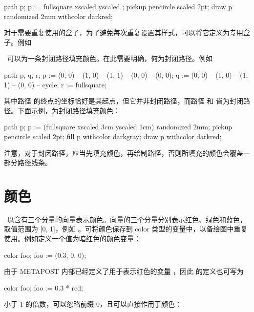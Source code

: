 \startexample
{}
path p;
p := fullsquare xscaled \overlaywidth yscaled \overlayheight;
pickup pencircle scaled 2pt;
draw p randomized 2mm withcolor darkred;
\stopuseMPgraphic

\stopexample
\typeexample[option=MP]  
\midaligned{\getexample}

对于需要重复使用的盒子，为了避免每次重复设置其样式，可以将它定义为专用盒子。例如

\starttyping[option=TEX]
\stoptyping

\METAPOST\ 可以为一条封闭路径填充颜色。在此需要明确，何为封闭路径。例如

\starttyping[option=MP]
path p, q, r;
p := (0, 0) -- (1, 0) -- (1, 1) -- (0, 0) -- (0, 0);
q := (0, 0) -- (1, 0) -- (1, 1) -- (0, 0) -- cycle;
r := fullsquare;
\stoptyping

\noindent 其中路径  的终点的坐标恰好是其起点，但它并非封闭路径，而路径  和  皆为封闭路径。下面示例，为封闭路径填充颜色：

\startexample
\startMPcode
path p;
p := (fullsquare xscaled 3cm yscaled 1cm) randomized 2mm;
pickup pencircle scaled 2pt;
fill p withcolor darkgray;
draw p withcolor darkred;
\stopMPcode
\stopexample
\simpleexample[option=MP]{\getexample}

\noindent 注意，对于封闭路径，应当先填充颜色，再绘制路径，否则所填充的颜色会覆盖一部分路径线条。

\section{颜色}

\METAPOST\ 以含有三个分量的向量表示颜色。向量的三个分量分别表示红色、绿色和蓝色，取值范围为 [0, 1]，例如 。可将颜色保存到 color 类型的变量中，以备绘图中重复使用。例如定义一个值为暗红色的颜色变量：

\starttyping[option=MP]
color foo;
foo := (0.3, 0, 0);
\stoptyping

由于 METAPOST 内部已经定义了用于表示红色的变量 ，因此  的定义也可写为

\starttyping[option=MP]
color foo;
foo := 0.3 * red;
\stoptyping

\noindent 小于 1 的倍数，可以忽略前缀 0，且可以直接作用于颜色：

